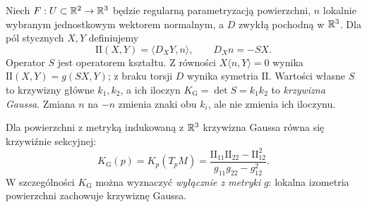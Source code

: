 \begin{definicja}
\label{def:druga-forma-podstawowa}
Niech $F:U\subset\mathbb{R}^2\to\mathbb{R}^3$ będzie regularną
parametryzacją powierzchni, $n$ lokalnie wybranym
jednostkowym wektorem normalnym, a $D$ zwykłą pochodną
w $\mathbb{R}^3$. Dla pól stycznych $X,Y$ definiujemy
\[
 \mathrm{II}(X,Y)=\langle D_XY,n\rangle,
 \qquad D_Xn=-S X.
\]
Operator $S$ jest operatorem kształtu. Z równości
$X\langle n,Y\rangle=0$ wynika
$\mathrm{II}(X,Y)=g(SX,Y)$; z braku torsji $D$
wynika symetria $\mathrm{II}$. Wartości własne $S$
to krzywizny główne $k_1,k_2$, a ich iloczyn
$K_{\mathrm G}=\det S=k_1k_2$ to \emph{krzywizna Gaussa}.
Zmiana $n$ na $-n$ zmienia znaki obu $k_i$,
ale nie zmienia ich iloczynu.
\end{definicja}

\begin{twierdzenie}
\label{thm:egregium}
Dla powierzchni z metryką indukowaną z $\mathbb{R}^3$
krzywizna Gaussa równa się krzywiźnie sekcyjnej:
\begin{equation}\label{eq:egregium}
 K_{\mathrm G}(p)=K_p(T_pM)
 =\frac{\mathrm{II}_{11}\mathrm{II}_{22}
                  -\mathrm{II}_{12}^{2}}
             {g_{11}g_{22}-g_{12}^{2}}.
\end{equation}
W szczególności $K_{\mathrm G}$ można wyznaczyć
\emph{wyłącznie z metryki} $g$: lokalna izometria
powierzchni zachowuje krzywiznę Gaussa.
\end{twierdzenie}

